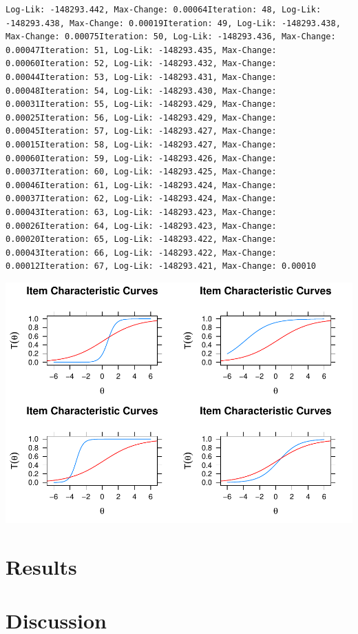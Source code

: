 \documentclass[
  english,
  man,floatsintext]{apa6}
\begin{document}
\begin{verbatim}
Log-Lik: -148293.442, Max-Change: 0.00064Iteration: 48, Log-Lik: -148293.438, Max-Change: 0.00019Iteration: 49, Log-Lik: -148293.438, Max-Change: 0.00075Iteration: 50, Log-Lik: -148293.436, Max-Change: 0.00047Iteration: 51, Log-Lik: -148293.435, Max-Change: 0.00060Iteration: 52, Log-Lik: -148293.432, Max-Change: 0.00044Iteration: 53, Log-Lik: -148293.431, Max-Change: 0.00048Iteration: 54, Log-Lik: -148293.430, Max-Change: 0.00031Iteration: 55, Log-Lik: -148293.429, Max-Change: 0.00025Iteration: 56, Log-Lik: -148293.429, Max-Change: 0.00045Iteration: 57, Log-Lik: -148293.427, Max-Change: 0.00015Iteration: 58, Log-Lik: -148293.427, Max-Change: 0.00060Iteration: 59, Log-Lik: -148293.426, Max-Change: 0.00037Iteration: 60, Log-Lik: -148293.425, Max-Change: 0.00046Iteration: 61, Log-Lik: -148293.424, Max-Change: 0.00037Iteration: 62, Log-Lik: -148293.424, Max-Change: 0.00043Iteration: 63, Log-Lik: -148293.423, Max-Change: 0.00026Iteration: 64, Log-Lik: -148293.423, Max-Change: 0.00020Iteration: 65, Log-Lik: -148293.422, Max-Change: 0.00043Iteration: 66, Log-Lik: -148293.422, Max-Change: 0.00012Iteration: 67, Log-Lik: -148293.421, Max-Change: 0.00010
\end{verbatim}

\includegraphics{ICC_project_files/figure-latex/iccs simulation-1.pdf}

\hypertarget{results-2}{%
\section{Results}\label{results-2}}

\hypertarget{discussion}{%
\section{Discussion}\label{discussion}}
\end{document}

